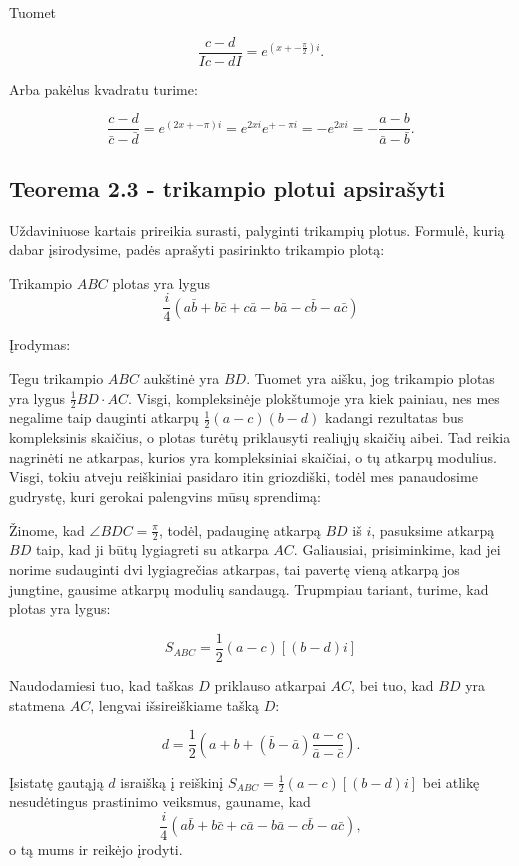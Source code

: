 \documentclass[11pt,a4paper,twoside]{book}
\theoremstyle{definition} \newtheorem*{api}{Apibrėžimas}
\theoremstyle{remark} \newtheorem*{pastaba}{Pastaba}
\begin{document}
Tuomet 

$$ \frac{c-d}{I c - dI } = e^{(x +- \frac{\pi}{2})i}.$$ 

Arba pakėlus kvadratu turime:

$$ \frac{c-d}{\bar c - \bar d } = e^{(2x +-\pi)i}=e^{2xi} e^{+-\pi i}= - e^{2xi} = - \frac{a-b}{\bar a - \bar b}.$$ 


\subsection*{Teorema 2.3 - trikampio plotui apsirašyti}

Uždaviniuose kartais prireikia surasti, palyginti trikampių plotus.
Formulė, kurią dabar įsirodysime, padės aprašyti pasirinkto trikampio
plotą:

Trikampio $ABC$ plotas yra lygus 
$$ \frac{i}{4}(a\bar{b}+ b \bar{c} + c \bar{a} - b\bar{a} - c \bar{b} - a \bar{c})$$

Įrodymas:

Tegu trikampio $ABC$ aukštinė yra $BD$. Tuomet yra aišku, jog trikampio plotas yra lygus 
$ \frac {1}{2} BD \cdot AC $. Visgi, kompleksinėje plokštumoje yra kiek painiau, nes mes
negalime taip dauginti atkarpų $\frac {1}{2} (a-c)(b-d) $ kadangi rezultatas bus 
kompleksinis skaičius, o plotas turėtų priklausyti realiųjų skaičių aibei. Tad reikia
nagrinėti ne atkarpas, kurios yra kompleksiniai skaičiai, o tų atkarpų modulius. Visgi, 
tokiu atveju reiškiniai pasidaro itin griozdiški, todėl mes panaudosime gudrystę, kuri 
gerokai palengvins mūsų sprendimą:

Žinome, kad $\angle BDC = \frac {\pi}{2}$, todėl, padauginę atkarpą $BD$ iš $i$, pasuksime atkarpą $BD$ taip, kad ji būtų lygiagreti su atkarpa $AC$. Galiausiai, prisiminkime, kad jei norime sudauginti dvi lygiagrečias atkarpas, tai pavertę vieną atkarpą jos jungtine, gausime atkarpų modulių sandaugą. Trupmpiau tariant, turime, kad plotas yra lygus:

$$ S_{ABC} = \frac{1}{2}( a-c)[(b-d)i] $$

Naudodamiesi tuo, kad taškas $D$ priklauso atkarpai $AC$, bei tuo, kad $BD$ yra statmena $AC$, lengvai išsireiškiame tašką $D$:

$$ d =\frac {1}{2} ( a+b + (\bar{b}-\bar{a}) \frac{a-c}{ \bar{a}-\bar{c}}).$$

Įsistatę gautąją $d$ israišką į reiškinį $ S_{ABC} = \frac{1}{2}( a-c)[(b-d)i] $ bei atlikę 
nesudėtingus prastinimo veiksmus, gauname, kad
$$ \frac {i}{4}(a\bar{b}+ b \bar{c} + c \bar{a} - b\bar{a} - c \bar{b} - a \bar{c}), $$ 
o tą mums ir reikėjo įrodyti.  
\end{document}
